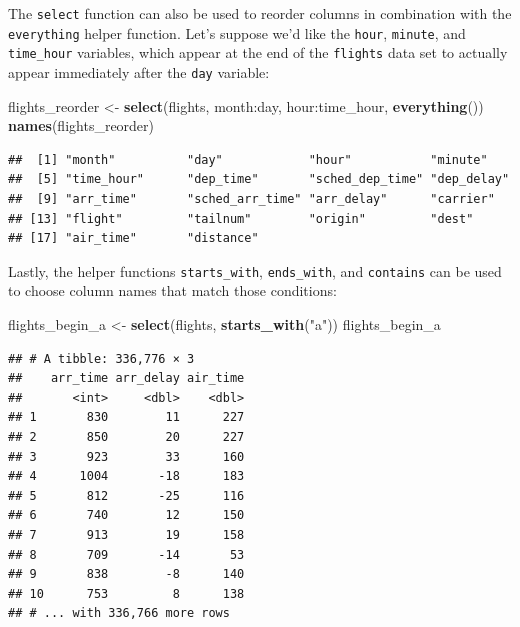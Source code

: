 \documentclass[]{tufte-book}
\newenvironment{Shaded}{\begin{snugshade}}{\end{snugshade}}
\newcommand{\KeywordTok}[1]{\textcolor[rgb]{0.13,0.29,0.53}{\textbf{{#1}}}}
\newcommand{\StringTok}[1]{\textcolor[rgb]{0.31,0.60,0.02}{{#1}}}
\newcommand{\NormalTok}[1]{{#1}}
\begin{document}
The \texttt{select} function can also be used to reorder columns in
combination with the \texttt{everything} helper function. Let's suppose
we'd like the \texttt{hour}, \texttt{minute}, and \texttt{time\_hour}
variables, which appear at the end of the \texttt{flights} data set to
actually appear immediately after the \texttt{day} variable:

\begin{Shaded}
\begin{Highlighting}[]
\NormalTok{flights_reorder <-}\StringTok{ }\KeywordTok{select}\NormalTok{(flights, month:day, hour:time_hour, }\KeywordTok{everything}\NormalTok{())}
\KeywordTok{names}\NormalTok{(flights_reorder)}
\end{Highlighting}
\end{Shaded}

\begin{verbatim}
##  [1] "month"          "day"            "hour"           "minute"        
##  [5] "time_hour"      "dep_time"       "sched_dep_time" "dep_delay"     
##  [9] "arr_time"       "sched_arr_time" "arr_delay"      "carrier"       
## [13] "flight"         "tailnum"        "origin"         "dest"          
## [17] "air_time"       "distance"
\end{verbatim}

Lastly, the helper functions \texttt{starts\_with}, \texttt{ends\_with},
and \texttt{contains} can be used to choose column names that match
those conditions:

\begin{Shaded}
\begin{Highlighting}[]
\NormalTok{flights_begin_a <-}\StringTok{ }\KeywordTok{select}\NormalTok{(flights, }\KeywordTok{starts_with}\NormalTok{(}\StringTok{"a"}\NormalTok{))}
\NormalTok{flights_begin_a}
\end{Highlighting}
\end{Shaded}

\begin{verbatim}
## # A tibble: 336,776 × 3
##    arr_time arr_delay air_time
##       <int>     <dbl>    <dbl>
## 1       830        11      227
## 2       850        20      227
## 3       923        33      160
## 4      1004       -18      183
## 5       812       -25      116
## 6       740        12      150
## 7       913        19      158
## 8       709       -14       53
## 9       838        -8      140
## 10      753         8      138
## # ... with 336,766 more rows
\end{verbatim}
\end{document}
